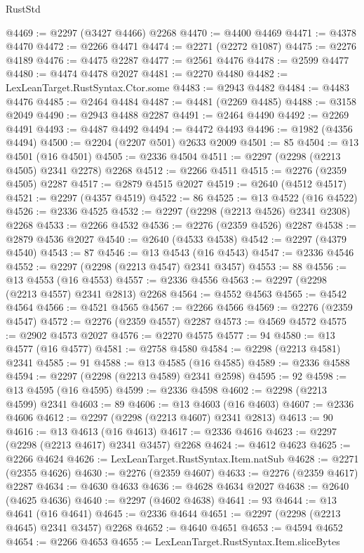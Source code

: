 \begin{lexlean}{RustStd}
\begin{coremodule}
{\begin{coremodule}
{{{{{{{{{{{{{{{{{{{{{{{{{{{{{{{{{{{{{{{{{{{{{{{{{{{{{{@4469 := @2297 (@3427 @4466) @2268
@4470 := @4400 @4469
@4471 := @4378 @4470
@4472 := @2266 @4471
@4474 := @2271 (@2272 @1087)
@4475 := @2276 @4189
@4476 := @4475 @2287
@4477 := @2561 @4476
@4478 := @2599 @4477
@4480 := @4474 @4478 @2027
@4481 := @2270 @4480
@4482 := LexLeanTarget.RustSyntax.Ctor.some
@4483 := @2943 @4482
@4484 := @4483 @4476
@4485 := @2464 @4484
@4487 := @4481 (@2269 @4485)
@4488 := @3158 @2049
@4490 := @2943 @4488 @2287
@4491 := @2464 @4490
@4492 := @2269 @4491
@4493 := @4487 @4492
@4494 := @4472 @4493
@4496 := @1982 (@4356 @4494)
@4500 := @2204 (@2207 @501) @2633 @2009
@4501 := 85
@4504 := @13 @4501 (@16 @4501)
@4505 := @2336 @4504
@4511 := @2297 (@2298 (@2213 @4505) @2341 @2278) @2268
@4512 := @2266 @4511
@4515 := @2276 (@2359 @4505) @2287
@4517 := @2879 @4515 @2027
@4519 := @2640 (@4512 @4517)
@4521 := @2297 (@4357 @4519)
@4522 := 86
@4525 := @13 @4522 (@16 @4522)
@4526 := @2336 @4525
@4532 := @2297 (@2298 (@2213 @4526) @2341 @2308) @2268
@4533 := @2266 @4532
@4536 := @2276 (@2359 @4526) @2287
@4538 := @2879 @4536 @2027
@4540 := @2640 (@4533 @4538)
@4542 := @2297 (@4379 @4540)
@4543 := 87
@4546 := @13 @4543 (@16 @4543)
@4547 := @2336 @4546
@4552 := @2297 (@2298 (@2213 @4547) @2341 @3457)
@4553 := 88
@4556 := @13 @4553 (@16 @4553)
@4557 := @2336 @4556
@4563 := @2297 (@2298 (@2213 @4557) @2341 @2813) @2268
@4564 := @4552 @4563
@4565 := @4542 @4564
@4566 := @4521 @4565
@4567 := @2266 @4566
@4569 := @2276 (@2359 @4547)
@4572 := @2276 (@2359 @4557) @2287
@4573 := @4569 @4572
@4575 := @2902 @4573 @2027
@4576 := @2270 @4575
@4577 := 94
@4580 := @13 @4577 (@16 @4577)
@4581 := @2758 @4580
@4584 := @2298 (@2213 @4581) @2341
@4585 := 91
@4588 := @13 @4585 (@16 @4585)
@4589 := @2336 @4588
@4594 := @2297 (@2298 (@2213 @4589) @2341 @2598)
@4595 := 92
@4598 := @13 @4595 (@16 @4595)
@4599 := @2336 @4598
@4602 := @2298 (@2213 @4599) @2341
@4603 := 89
@4606 := @13 @4603 (@16 @4603)
@4607 := @2336 @4606
@4612 := @2297 (@2298 (@2213 @4607) @2341 @2813)
@4613 := 90
@4616 := @13 @4613 (@16 @4613)
@4617 := @2336 @4616
@4623 := @2297 (@2298 (@2213 @4617) @2341 @3457) @2268
@4624 := @4612 @4623
@4625 := @2266 @4624
@4626 := LexLeanTarget.RustSyntax.Item.natSub
@4628 := @2271 (@2355 @4626)
@4630 := @2276 (@2359 @4607)
@4633 := @2276 (@2359 @4617) @2287
@4634 := @4630 @4633
@4636 := @4628 @4634 @2027
@4638 := @2640 (@4625 @4636)
@4640 := @2297 (@4602 @4638)
@4641 := 93
@4644 := @13 @4641 (@16 @4641)
@4645 := @2336 @4644
@4651 := @2297 (@2298 (@2213 @4645) @2341 @3457) @2268
@4652 := @4640 @4651
@4653 := @4594 @4652
@4654 := @2266 @4653
@4655 := LexLeanTarget.RustSyntax.Item.sliceBytes
}}}}}}}}}}}}}}}}}}}}}}}}}}}}}}}}}}}}}}}}}}}}}}}}}}}}}}
\end{coremodule}}
\end{coremodule}
\end{lexlean}
